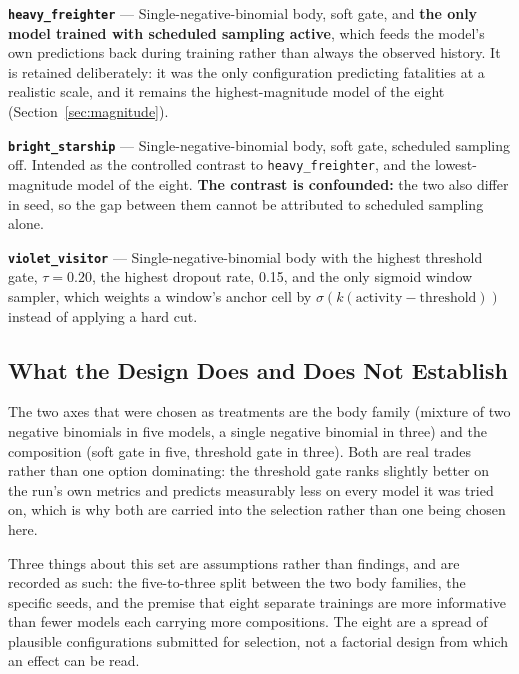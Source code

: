 \noindent\textbf{\texttt{heavy\_freighter}} --- Single-negative-binomial body, soft gate, and
\textbf{the only model trained with scheduled sampling active}, which feeds the model's own
predictions back during training rather than always the observed history. It is retained
deliberately: it was the only configuration predicting fatalities at a realistic scale, and it
remains the highest-magnitude model of the eight (Section~\ref{sec:magnitude}).

\noindent\textbf{\texttt{bright\_starship}} --- Single-negative-binomial body, soft gate,
scheduled sampling off. Intended as the controlled contrast to \texttt{heavy\_freighter}, and the
lowest-magnitude model of the eight. \textbf{The contrast is confounded:} the two also differ in
seed, so the gap between them cannot be attributed to scheduled sampling alone.

\noindent\textbf{\texttt{violet\_visitor}} --- Single-negative-binomial body with the highest
threshold gate, $\tau = 0.20$, the highest dropout rate, 0.15, and the only sigmoid window
sampler, which weights a window's anchor cell by $\sigma(k(\text{activity} - \text{threshold}))$
instead of applying a hard cut.

\subsection*{What the Design Does and Does Not Establish}

The two axes that were chosen as treatments are the body family (mixture of two negative binomials
in five models, a single negative binomial in three) and the composition (soft gate in five,
threshold gate in three). Both are real trades rather than one option dominating: the threshold
gate ranks slightly better on the run's own metrics and predicts measurably less on every model it
was tried on, which is why both are carried into the selection rather than one being chosen here.

Three things about this set are assumptions rather than findings, and are recorded as such: the
five-to-three split between the two body families, the specific seeds, and the premise that eight
separate trainings are more informative than fewer models each carrying more compositions. The
eight are a spread of plausible configurations submitted for selection, not a factorial design
from which an effect can be read.
